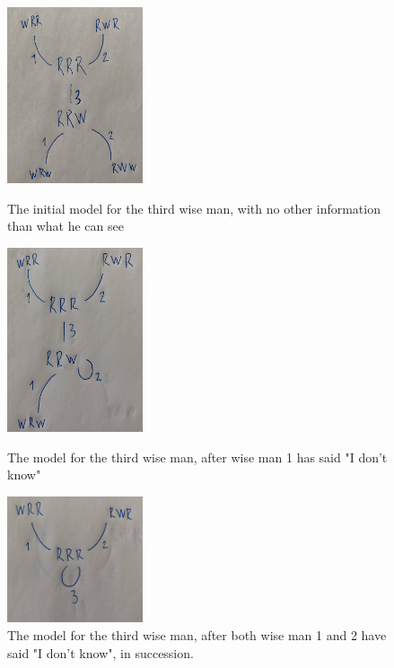 \begin{figure}
	\begin{minipage}[c]{3cm}
\includegraphics[width=4cm]{images/three_wise_men_round_0.png}
	\caption{The initial model for the third wise man, with no other information than what he can see}

	\label{fig:twm-round-0}
\end{minipage}
\hfill
	\begin{minipage}[c]{3cm}
	\includegraphics[width=4cm]{images/three_wise_men_round_1.png}
	\caption{The model for the third wise man, after wise man 1 has said "I don't know"}

	\label{fig:twm-round-1}
\end{minipage}
\hfill
	\begin{minipage}[c]{3cm}
	\includegraphics[width=4cm]{images/three_wise_men_round_2.png}
	\caption{The model for the third wise man, after both wise man 1 and 2 have said "I don't know", in succession.}

	\label{fig:twm-round-2}
\end{minipage}
\end{figure}

